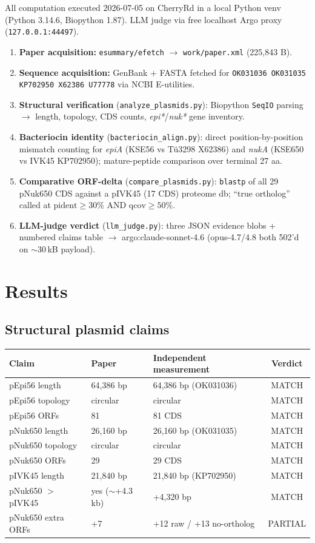 \documentclass[11pt,letterpaper]{article}
\begin{document}
All computation executed 2026-07-05 on CherryRd in a local Python venv (Python 3.14.6, Biopython 1.87). LLM judge via free localhost Argo proxy (\texttt{127.0.0.1:44497}).

\begin{enumerate}
  \item \textbf{Paper acquisition:} \texttt{esummary/efetch} $\rightarrow$ \texttt{work/paper.xml} (225{,}843 B).
  \item \textbf{Sequence acquisition:} GenBank + FASTA fetched for \texttt{OK031036 OK031035 KP702950 X62386 U77778} via NCBI E-utilities.
  \item \textbf{Structural verification} (\texttt{analyze\_plasmids.py}): Biopython \texttt{SeqIO} parsing $\rightarrow$ length, topology, CDS counts, \textit{epi*}/\textit{nuk*} gene inventory.
  \item \textbf{Bacteriocin identity} (\texttt{bacteriocin\_align.py}): direct position-by-position mismatch counting for \textit{epiA} (KSE56 vs T\"u3298 X62386) and \textit{nukA} (KSE650 vs IVK45 KP702950); mature-peptide comparison over terminal 27 aa.
  \item \textbf{Comparative ORF-delta} (\texttt{compare\_plasmids.py}): \texttt{blastp} of all 29 pNuk650 CDS against a pIVK45 (17 CDS) proteome db; ``true ortholog'' called at $\text{pident}\geq 30\%$ AND $\text{qcov}\geq 50\%$.
  \item \textbf{LLM-judge verdict} (\texttt{llm\_judge.py}): three JSON evidence blobs + numbered claims table $\rightarrow$ argo:claude-sonnet-4.6 (opus-4.7/4.8 both 502'd on $\sim$30\,kB payload).
\end{enumerate}

\section{Results}

\subsection{Structural plasmid claims}

\begin{longtable}{lllc}
\toprule
Claim & Paper & Independent measurement & Verdict \\
\midrule
pEpi56 length & 64{,}386 bp & 64{,}386 bp (OK031036) & MATCH \\
pEpi56 topology & circular & circular & MATCH \\
pEpi56 ORFs & 81 & 81 CDS & MATCH \\
pNuk650 length & 26{,}160 bp & 26{,}160 bp (OK031035) & MATCH \\
pNuk650 topology & circular & circular & MATCH \\
pNuk650 ORFs & 29 & 29 CDS & MATCH \\
pIVK45 length & 21{,}840 bp & 21{,}840 bp (KP702950) & MATCH \\
pNuk650 $>$ pIVK45 & yes ($\sim$+4.3 kb) & +4{,}320 bp & MATCH \\
pNuk650 extra ORFs & +7 & +12 raw / +13 no-ortholog & PARTIAL \\
\bottomrule
\end{longtable}
\end{document}
